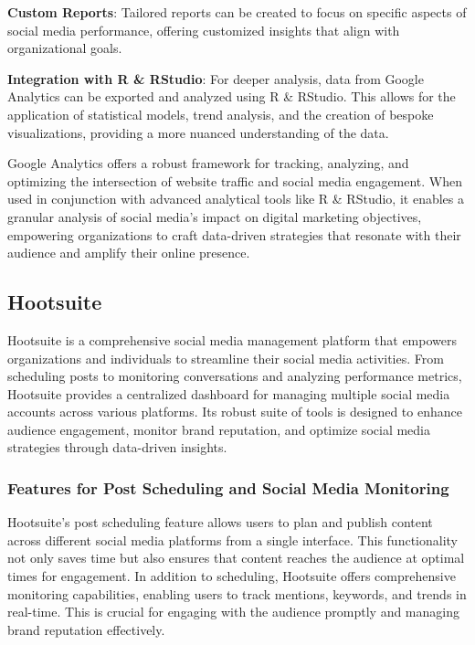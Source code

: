 \documentclass[
]{book}
\begin{document}
\textbf{Custom Reports}: Tailored reports can be created to focus on specific aspects of social media performance, offering customized insights that align with organizational goals.

\textbf{Integration with R \& RStudio}: For deeper analysis, data from Google Analytics can be exported and analyzed using R \& RStudio. This allows for the application of statistical models, trend analysis, and the creation of bespoke visualizations, providing a more nuanced understanding of the data.

Google Analytics offers a robust framework for tracking, analyzing, and optimizing the intersection of website traffic and social media engagement. When used in conjunction with advanced analytical tools like R \& RStudio, it enables a granular analysis of social media's impact on digital marketing objectives, empowering organizations to craft data-driven strategies that resonate with their audience and amplify their online presence.

\hypertarget{hootsuite}{%
\subsection*{Hootsuite}\label{hootsuite}}

Hootsuite is a comprehensive social media management platform that empowers organizations and individuals to streamline their social media activities. From scheduling posts to monitoring conversations and analyzing performance metrics, Hootsuite provides a centralized dashboard for managing multiple social media accounts across various platforms. Its robust suite of tools is designed to enhance audience engagement, monitor brand reputation, and optimize social media strategies through data-driven insights.

\hypertarget{features-for-post-scheduling-and-social-media-monitoring}{%
\subsubsection*{Features for Post Scheduling and Social Media Monitoring}\label{features-for-post-scheduling-and-social-media-monitoring}}

Hootsuite's post scheduling feature allows users to plan and publish content across different social media platforms from a single interface. This functionality not only saves time but also ensures that content reaches the audience at optimal times for engagement. In addition to scheduling, Hootsuite offers comprehensive monitoring capabilities, enabling users to track mentions, keywords, and trends in real-time. This is crucial for engaging with the audience promptly and managing brand reputation effectively.
\end{document}
